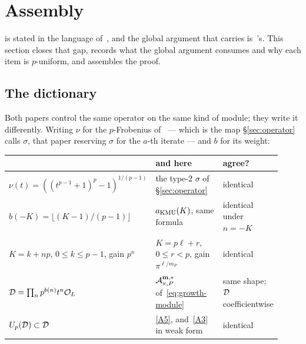 
\section{Assembly}
\label{sec:assembly}

 is stated in the language of~\cite{kramermillerupton2021newton}, and the global argument that carries
 is~\cite{kramermiller2020abelian}'s. This section closes
that gap, records what the global argument consumes and why each item is
$p$-uniform, and assembles the proof.

\subsection{The dictionary}
\label{sec:dictionary}

Both papers control the same operator on the same kind of module; they write
it differently. Writing $\nu$ for the $p$-Frobenius of~\cite[\S4.2]{kramermiller2020abelian} --- which is the map
\S\ref{sec:operator} calls $\sigma$, that paper reserving $\sigma$ for the
$a$-th iterate --- and $b$ for its weight:

\begin{center}\small
\begin{tabular}{@{}>{\raggedright\arraybackslash}p{0.38\linewidth}>{\raggedright\arraybackslash}p{0.34\linewidth}>{\raggedright\arraybackslash}p{0.20\linewidth}@{}}
\toprule
\cite{kramermiller2020abelian}
  & \cite{kramermillerupton2021newton} and here & agree? \\
\midrule
$\nu(t) = ((t^{p-1}+1)^p-1)^{1/(p-1)}$
  & the type-$2$ $\sigma$ of \S\ref{sec:operator} & identical \\
$b(-K) = \lfloor (K-1)/(p-1) \rfloor$
  & $a_{\mathrm{KMU}}(K)$, same formula
  & identical under $n = -K$ \\
$K = k+np$, $0 \le k \le p-1$, gain $p^n$
  & $K = p\ell + r$, $0 \le r < p$, gain $\pi^{\ell/m_P}$
  & identical \\
$\mathcal{D} = \prod_n p^{b(n)}t^n\mathcal{O}_L$
  & $\mathcal{A}^{\mathbf{m},*}_{\pi,P}$ of~\eqref{eq:growth-module}
  & same shape; $\mathcal{D}$ coefficientwise \\
$U_p(\mathcal{D}) \subset \mathcal{D}$
  & \ref{A5}, and~\ref{A3} in weak form
  & identical \\
\bottomrule
\end{tabular}
\end{center}

